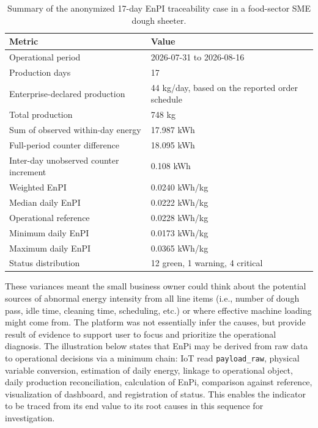 \documentclass[technologies,article,submit,pdftex,moreauthors]{Definitions/mdpi}
\begin{document}
\begin{table}[H]
\caption{Summary of the anonymized 17-day EnPI traceability case in a food-sector SME dough sheeter.}
\label{tab:caso-real-summary}
\centering
\scriptsize
\begin{tabular}{p{}p{}}
\toprule
Metric & Value \\
\midrule
Operational period & 2026-07-31 to 2026-08-16 \\
Production days & 17 \\
Enterprise-declared production & 44 kg/day, based on the reported order schedule \\
Total production & 748 kg \\
Sum of observed within-day energy & 17.987 kWh \\
Full-period counter difference & 18.095 kWh \\
Inter-day unobserved counter increment & 0.108 kWh \\
Weighted EnPI & 0.0240 kWh/kg \\
Median daily EnPI & 0.0222 kWh/kg \\
Operational reference & 0.0228 kWh/kg \\
Minimum daily EnPI & 0.0173 kWh/kg \\
Maximum daily EnPI & 0.0365 kWh/kg \\
Status distribution & 12 green, 1 warning, 4 critical \\
\bottomrule
\end{tabular}
\end{table}

These variances meant the small business owner could think about the potential sources of abnormal energy intensity from all line items (i.e., number of dough pass, idle time, cleaning time, scheduling, etc.) or where effective machine loading might come from. The platform was not essentially infer the causes, but provide result of evidence to support user to focus and prioritize the operational diagnosis. The illustration below states that EnPi may be derived from raw data to operational decisions via a minimum chain: IoT read \texttt{payload\_raw}, physical variable conversion, estimation of daily energy, linkage to operational object, daily production reconciliation, calculation of EnPi, comparison against reference, visualization of dashboard, and registration of status. This enables the indicator to be traced from its end value to its root causes in this sequence for investigation. 
\end{document}

